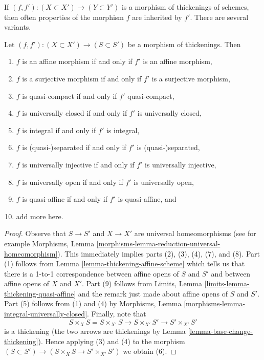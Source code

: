 \noindent
If $(f, f') : (X \subset X') \to (Y \subset Y')$ is a morphism
of thickenings of schemes, then often properties of the morphism
$f$ are inherited by $f'$. There are several variants.

\begin{lemma}
\label{lemma-thicken-property-morphisms}
Let $(f, f') : (X \subset X') \to (S \subset S')$ be a morphism
of thickenings. Then
\begin{enumerate}
\item $f$ is an affine morphism if and only if $f'$ is an affine morphism,
\item $f$ is a surjective morphism if and only if $f'$ is a surjective morphism,
\item $f$ is quasi-compact if and only if $f'$ quasi-compact,
\item $f$ is universally closed if and only if $f'$ is universally closed,
\item $f$ is integral if and only if $f'$ is integral,
\item $f$ is (quasi-)separated if and only if $f'$ is (quasi-)separated,
\item $f$ is universally injective if and only if $f'$ is universally injective,
\item $f$ is universally open if and only if $f'$ is universally open,
\item $f$ is quasi-affine if and only if $f'$ is quasi-affine, and
\item add more here.
\end{enumerate}
\end{lemma}

\begin{proof}
Observe that $S \to S'$ and $X \to X'$ are universal homeomorphisms
(see for example
Morphisms, Lemma \ref{morphisms-lemma-reduction-universal-homeomorphism}).
This immediately implies parts (2), (3), (4), (7), and (8).
Part (1) follows from Lemma \ref{lemma-thickening-affine-scheme}
which tells us that there is a 1-to-1 correspondence between
affine opens of $S$ and $S'$ and between affine opens of $X$ and $X'$.
Part (9) follows from
Limits, Lemma \ref{limits-lemma-thickening-quasi-affine}
and the remark just made about affine opens of $S$ and $S'$.
Part (5) follows from (1) and (4) by
Morphisms, Lemma \ref{morphisms-lemma-integral-universally-closed}.
Finally, note that
$$
S \times_X S = S \times_{X'} S \to S \times_{X'} S' \to S' \times_{X'} S'
$$
is a thickening (the two arrows are thickenings by
Lemma \ref{lemma-base-change-thickening}).
Hence applying (3) and (4) to the morphism
$(S \subset S') \to (S \times_X S \to S' \times_{X'} S')$
we obtain (6).
\end{proof}


